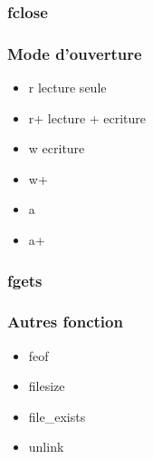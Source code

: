 \documentclass[12pt,a4paper,openany]{article}
\begin{document}
			\subsubsection{fclose}
				
			\subsubsection{Mode d'ouverture}
				\begin{itemize}
					\item r lecture seule
					\item r+ lecture + ecriture
					\item w ecriture
					\item w+
					\item a
					\item a+
				\end{itemize}
			\subsubsection{fgets}
				
				

			\subsubsection{Autres fonction}
				\begin{itemize}
					\item feof
					\item filesize
					\item file\_exists
					\item unlink
				\end{itemize}	
			
			
\end{document}
